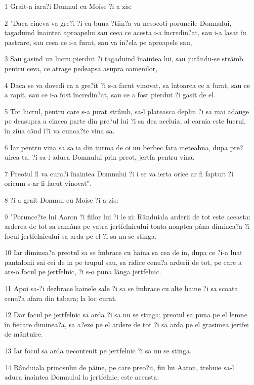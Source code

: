 \par 1 Grait-a iara?i Domnul cu Moise ?i a zis:
\par 2 "Daca cineva va gre?i ?i cu buna ?tiin?a va nesocoti poruncile Domnului, tagaduind înaintea aproapelui sau ceea ce acesta i-a încredin?at, sau i-a lasat în pastrare, sau ceea ce i-a furat, sau va în?ela pe aproapele sau,
\par 3 Sau gasind un lucru pierdut ?i tagaduind înaintea lui, sau jurându-se strâmb pentru ceva, ce atrage pedeapsa asupra oamenilor,
\par 4 Daca se va dovedi ca a gre?it ?i s-a facut vinovat, sa întoarca ce a furat, sau ce a rapit, sau ce i-a fost încredin?at, sau ce a fost pierdut ?i gasit de el.
\par 5 Tot lucrul, pentru care s-a jurat strâmb, sa-l plateasca deplin ?i sa mai adauge pe deasupra a cincea parte din pre?ul lui ?i sa dea aceluia, al caruia este lucrul, în ziua când î?i va cunoa?te vina sa.
\par 6 Iar pentru vina sa sa ia din turma de oi un berbec fara meteahna, dupa pre?uirea ta, ?i sa-l aduca Domnului prin preot, jertfa pentru vina.
\par 7 Preotul îl va cura?i înaintea Domnului ?i i se va ierta orice ar fi faptuit ?i oricum s-ar fi facut vinovat".
\par 8 ?i a grait Domnul cu Moise ?i a zis:
\par 9 "Porunce?te lui Aaron ?i fiilor lui ?i le zi: Rânduiala arderii de tot este aceasta: arderea de tot sa ramâna pe vatra jertfelnicului toata noaptea pâna diminea?a ?i focul jertfelnicului sa arda pe el ?i sa nu se stinga.
\par 10 Iar diminea?a preotul sa se îmbrace cu haina sa cea de in, dupa ce ?i-a luat pantalonii sai cei de in pe trupul sau, sa ridice cenu?a arderii de tot, pe care a ars-o focul pe jertfelnic, ?i s-o puna lânga jertfelnic.
\par 11 Apoi sa-?i dezbrace hainele sale ?i sa se îmbrace cu alte haine ?i sa scoata cenu?a afara din tabara; la loc curat.
\par 12 Dar focul pe jertfelnic sa arda ?i sa nu se stinga; preotul sa puna pe el lemne în fiecare diminea?a, sa a?eze pe el ardere de tot ?i sa arda pe el grasimea jertfei de mântuire.
\par 13 Iar focul sa arda necontenit pe jertfelnic ?i sa nu se stinga.
\par 14 Rânduiala prinosului de pâine, pe care preo?ii, fiii lui Aaron, trebuie sa-l aduca înaintea Domnului la jertfelnic, este aceasta:
